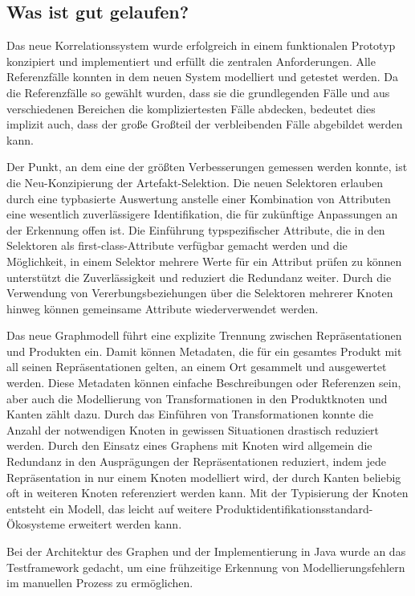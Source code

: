 \subsection{Was ist gut gelaufen?}\label{subsec:discussion-positive}

Das neue Korrelationssystem wurde erfolgreich in einem funktionalen Prototyp konzipiert und implementiert und erfüllt die zentralen Anforderungen.
Alle Referenzfälle konnten in dem neuen System modelliert und getestet werden.
Da die Referenzfälle so gewählt wurden, dass sie die grundlegenden Fälle und aus verschiedenen Bereichen die kompliziertesten Fälle abdecken, bedeutet dies implizit auch, dass der große Großteil der verbleibenden Fälle abgebildet werden kann.

Der Punkt, an dem eine der größten Verbesserungen gemessen werden konnte, ist die Neu-Konzipierung der Artefakt-Selektion.
Die neuen Selektoren erlauben durch eine typbasierte Auswertung anstelle einer Kombination von Attributen eine wesentlich zuverlässigere Identifikation, die für zukünftige Anpassungen an der Erkennung offen ist.
Die Einführung typspezifischer Attribute, die in den Selektoren als first-class-Attribute verfügbar gemacht werden und die Möglichkeit, in einem Selektor mehrere Werte für ein Attribut prüfen zu können unterstützt die Zuverlässigkeit und reduziert die Redundanz weiter.
Durch die Verwendung von Vererbungsbeziehungen über die Selektoren mehrerer Knoten hinweg können gemeinsame Attribute wiederverwendet werden.

Das neue Graphmodell führt eine explizite Trennung zwischen Repräsentationen und Produkten ein.
Damit können Metadaten, die für ein gesamtes Produkt mit all seinen Repräsentationen gelten, an einem Ort gesammelt und ausgewertet werden.
Diese Metadaten können einfache Beschreibungen oder Referenzen sein, aber auch die Modellierung von Transformationen in den Produktknoten und Kanten zählt dazu.
Durch das Einführen von Transformationen konnte die Anzahl der notwendigen Knoten in gewissen Situationen drastisch reduziert werden.
Durch den Einsatz eines Graphens mit Knoten wird allgemein die Redundanz in den Ausprägungen der Repräsentationen reduziert, indem jede Repräsentation in nur einem Knoten modelliert wird, der durch Kanten beliebig oft in weiteren Knoten referenziert werden kann.
Mit der Typisierung der Knoten entsteht ein Modell, das leicht auf weitere Produktidentifikationsstandard-Ökosysteme erweitert werden kann.

Bei der Architektur des Graphen und der Implementierung in Java wurde an das Testframework gedacht, um eine frühzeitige Erkennung von Modellierungsfehlern im manuellen Prozess zu ermöglichen.

